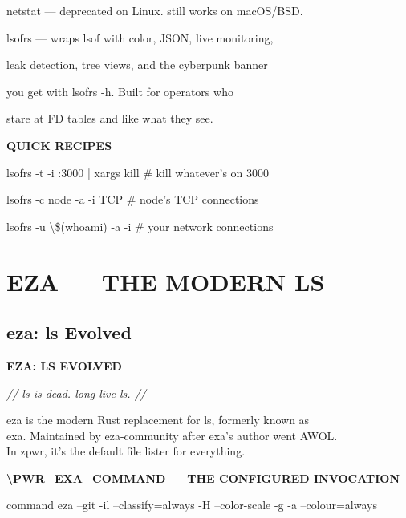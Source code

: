 \documentclass[11pt,a4paper,twoside]{book}
\begin{document}
netstat — deprecated on Linux. still works on macOS/BSD.

lsofrs  — wraps lsof with color, JSON, live monitoring,

leak detection, tree views, and the cyberpunk banner

you get with lsofrs -h. Built for operators who

stare at FD tables and like what they see.


\vspace{12pt}
{\bfseries\color{neonyellow} QUICK RECIPES}\vspace{4pt}

lsofrs -t -i :3000 | xargs kill  \# kill whatever's on 3000

lsofrs -c node -a -i TCP          \# node's TCP connections

lsofrs -u \textbackslash{}\$(whoami) -a -i         \# your network connections


\vspace{16pt}


\chapter{EZA — THE MODERN LS}

\section{eza: ls Evolved}


\vspace{10pt}
{\large\bfseries\color{neoncyan} EZA: LS EVOLVED}\vspace{6pt}

{\small\itshape\color{dimtext} // ls is dead. long live ls. //}

\begin{codebox}
eza is the modern Rust replacement for ls, formerly known as\\
exa. Maintained by eza-community after exa's author went AWOL.\\
In zpwr, it's the default file lister for everything.\\
\end{codebox}


\vspace{12pt}
{\bfseries\color{neonyellow} \textbackslash{}PWR\_EXA\_COMMAND — THE CONFIGURED INVOCATION}\vspace{4pt}

\begin{codebox}
command eza --git -il --classify=always -H --color-scale -g -a --colour=always\\
\end{codebox}
\end{document}
